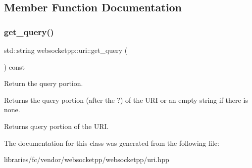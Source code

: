 \subsection{Member Function Documentation}
\mbox{\label{classwebsocketpp_1_1uri_a74950872d4c2a4c18df2ec5c9fca1877}} 
\subsubsection{\texorpdfstring{get\+\_\+query()}{get\_query()}}
{\footnotesize\ttfamily std\+::string websocketpp\+::uri\+::get\+\_\+query (\begin{DoxyParamCaption}{ }\end{DoxyParamCaption}) const\hspace{0.3cm}{\ttfamily [inline]}}



Return the query portion. 

Returns the query portion (after the ?) of the U\+RI or an empty string if there is none.

\begin{DoxyReturn}{Returns}
query portion of the U\+RI. 
\end{DoxyReturn}


The documentation for this class was generated from the following file\+:\begin{DoxyCompactItemize}
\item 
libraries/fc/vendor/websocketpp/websocketpp/uri.\+hpp\end{DoxyCompactItemize}
